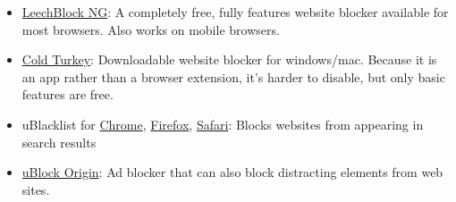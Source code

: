 \documentclass[
  openany]{book}
\providecommand{\tightlist}{%
  \setlength{\itemsep}{0pt}\setlength{\parskip}{0pt}}
\begin{document}
\begin{itemize}
\tightlist
\item
  \href{https://www.proginosko.com/leechblock/}{LeechBlock NG}: A completely free, fully features website blocker available for most browsers. Also works on mobile browsers.
\item
  \href{https://getcoldturkey.com/}{Cold Turkey}: Downloadable website blocker for windows/mac. Because it is an app rather than a browser extension, it's harder to disable, but only basic features are free.
\item
  uBlacklist for \href{https://chromewebstore.google.com/detail/ublacklist/pncfbmialoiaghdehhbnbhkkgmjanfhe}{Chrome}, \href{https://addons.mozilla.org/en-US/firefox/addon/ublacklist/}{Firefox}, \href{https://apps.apple.com/us/app/ublacklist-for-safari/id1547912640}{Safari}: Blocks websites from appearing in search results
\item
  \href{https://ublockorigin.com/}{uBlock Origin}: Ad blocker that can also block distracting elements from web sites.
\end{itemize}
\end{document}
